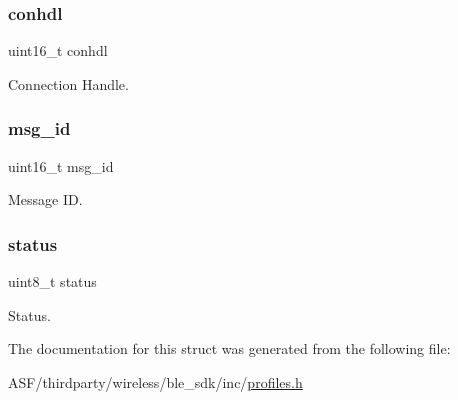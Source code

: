 \subsubsection{\texorpdfstring{conhdl}{conhdl}}
{\footnotesize\ttfamily uint16\+\_\+t conhdl}



Connection Handle. 

\mbox{\label{structprf__server__error__ind_a689014fc11d4f26d264ddae2eaebc9d8}} 
\subsubsection{\texorpdfstring{msg\_id}{msg\_id}}
{\footnotesize\ttfamily uint16\+\_\+t msg\+\_\+id}



Message ID. 

\mbox{\label{structprf__server__error__ind_ade818037fd6c985038ff29656089758d}} 
\subsubsection{\texorpdfstring{status}{status}}
{\footnotesize\ttfamily uint8\+\_\+t status}



Status. 



The documentation for this struct was generated from the following file\+:\begin{DoxyCompactItemize}
\item 
A\+S\+F/thirdparty/wireless/ble\+\_\+sdk/inc/\mbox{\hyperlink{profiles_8h}{profiles.\+h}}\end{DoxyCompactItemize}
